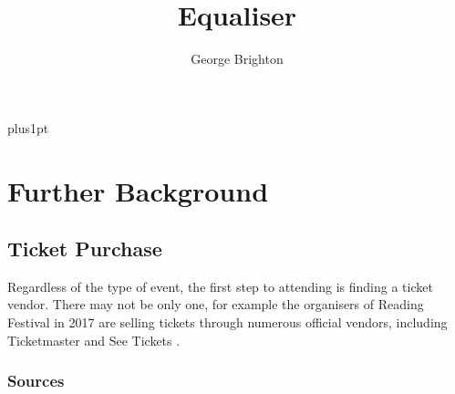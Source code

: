 \documentclass[12pt]{bhamdissertation}
\title{Equaliser}
\author{George Brighton}             %
\begin{document}
\baselineskip=18pt plus1pt

\setcounter{secnumdepth}{3}
\setcounter{tocdepth}{1}

\maketitle                  %

\begin{romanpages}          %

\tableofcontents

\cleardoublepage{}
\begin{abstract}
\lipsum[1-1] %
\end{abstract}

\cleardoublepage{}
\begin{acknowledgements}
\lipsum[2-2] %
\end{acknowledgements}

\end{romanpages}            %



\iffalse
\chapter{Further Background}

\section{Ticket Purchase}

Regardless of the type of event, the first step to attending is finding a ticket vendor. There may not be only one, for example the organisers of Reading Festival in 2017 are selling tickets through numerous official vendors, including Ticketmaster and See Tickets \autocite{R16}.

\subsection{Sources}
\end{document}
